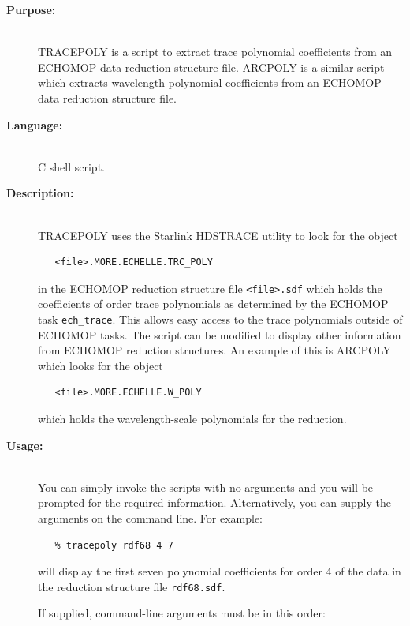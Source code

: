 \documentclass[twoside,11pt]{article}
\newcommand{\xref}[3]{#1}
\begin{document}
\begin{description}

\item [{\bf Purpose:}] \mbox{} \\
     TRACEPOLY is a script to extract trace polynomial coefficients from an
     \xref{ECHOMOP}{sun152}{} data reduction structure file.
     ARCPOLY is a similar script which extracts wavelength polynomial
     coefficients from an \xref{ECHOMOP}{sun152}{} data reduction structure
     file.

\item [{\bf Language:}] \mbox{} \\
     C shell script.

\item [{\bf Description:}] \mbox{} \\
     TRACEPOLY uses the Starlink \xref{HDSTRACE}{sun102}{} utility to
     look for the object
\begin{verbatim}
   <file>.MORE.ECHELLE.TRC_POLY
\end{verbatim}
     in the ECHOMOP reduction structure file \verb+<file>.sdf+ which holds
     the coefficients of order trace polynomials as determined by
     the ECHOMOP task \xref{{\tt{ech\_trace}}}{sun152}{ech_trace}.
     This allows easy access to
     the trace polynomials outside of ECHOMOP tasks.  The script
     can be modified to display other information from ECHOMOP
     reduction structures.  An example of this is ARCPOLY which looks
     for the object
\begin{verbatim}
   <file>.MORE.ECHELLE.W_POLY
\end{verbatim}
     which holds the wavelength-scale polynomials for the reduction.

\item [{\bf Usage:}] \mbox{} \\
     You can simply invoke the scripts with no arguments and you
     will be prompted for the required information.  Alternatively,
     you can supply the arguments on the command line.  For example:

\begin{verbatim}
   % tracepoly rdf68 4 7
\end{verbatim}

     will display the first seven polynomial coefficients for order 4
     of the data in the reduction structure file \verb+rdf68.sdf+.

     If supplied, command-line arguments must be in this order:


\end{description}
\end{document}
